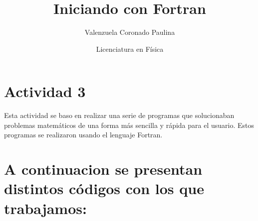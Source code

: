 \documentclass[12pt]{article}
\title{Iniciando con Fortran}
\author{Valenzuela Coronado Paulina}
\date{Licenciatura en Física}
\begin{document}
\maketitle

\section{Actividad 3}
Esta actividad se baso en realizar una serie de programas que solucionaban problemas matemáticos de una forma más sencilla y rápida para el usuario.
Estos programas se realizaron usando el lenguaje Fortran.

\section{A continuacion se presentan distintos códigos con los que trabajamos:}
\end{document}
